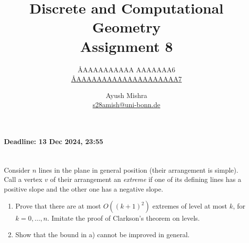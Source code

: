 \documentclass{article}
\title{Discrete and Computational Geometry \\ Assignment 8}
\author{
  \AA{AAAAAAAAAA AAAAAAA}{6} \\
  \href{mailto:\AA{AAAAAAAAAAAAAAAAAAAA}{7}}{\AA{AAAAAAAAAAAAAAAAAAAA}{7}}
  \and
  Ayush Mishra \\
  \href{mailto:s28amish@uni-bonn.de}{s28amish@uni-bonn.de}
}
\begin{document}
  \maketitle
  \begin{center}
    { \bfseries Deadline: 13 Dec 2024, 23:55 }
  \end{center}

  \section{}
  \begin{centerframebox}
    Consider \(n\) lines in the plane in general position (their arrangement is simple). Call a vertex \(v\) of their arrangement an \textit{extreme} if one of its defining lines has a positive slope and the other one has a negative slope.
    
    \begin{enumerate}[label=\alph*)]
    \item Prove that there are at most \(O((k + 1)^2)\) extremes of level at most \(k\), for \(k = 0, \ldots, n\). Imitate the proof of Clarkson's theorem on levels.
    \item Show that the bound in a) cannot be improved in general.
    \end{enumerate}
  \end{centerframebox}
\end{document}
